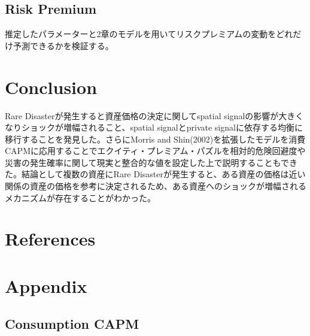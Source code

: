 \documentclass{jsarticle}
\begin{document}
\subsection{Risk Premium}
推定したパラメーターと2章のモデルを用いてリスクプレミアムの変動をどれだけ予測できるかを検証する。
\section{Conclusion}
Rare Disasterが発生すると資産価格の決定に関してspatial signalの影響が大きくなりショックが増幅されること、spatial signalとprivate signalに依存する均衡に移行することを発見した。さらにMorris and Shin(2002)を拡張したモデルを消費CAPMに応用することでエクイティ・プレミアム・パズルを相対的危険回避度や災害の発生確率に関して現実と整合的な値を設定した上で説明することもできた。結論として複数の資産にRare Disasterが発生すると、ある資産の価格は近い関係の資産の価格を参考に決定されるため、ある資産へのショックが増幅されるメカニズムが存在することがわかった。


\section{References}

\section{Appendix}
\subsection{Consumption CAPM}
\end{document}
